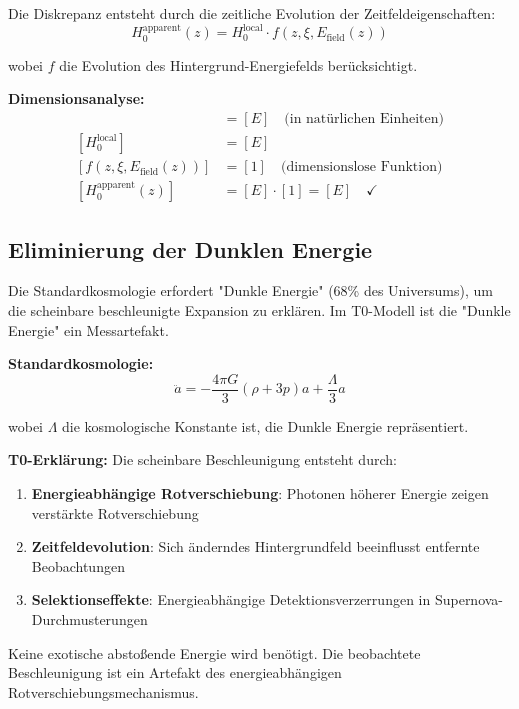 \documentclass[12pt,a4paper]{report}
\begin{document}
	Die Diskrepanz entsteht durch die zeitliche Evolution der Zeitfeldeigenschaften:
	\begin{equation}
		H_0^{\text{apparent}}(z) = H_0^{\text{local}} \cdot f(z, \xi, E_{\text{field}}(z))
	\end{equation}
	
	wobei $f$ die Evolution des Hintergrund-Energiefelds berücksichtigt.
	
	\textbf{Dimensionsanalyse:}
	\begin{align}
		[H_0^{\text{apparent}}(z)] &= [E] \quad \text{(in natürlichen Einheiten)} \\
		[H_0^{\text{local}}] &= [E] \\
		[f(z, \xi, E_{\text{field}}(z))] &= [1] \quad \text{(dimensionslose Funktion)} \\
		[H_0^{\text{apparent}}(z)] &= [E] \cdot [1] = [E] \quad \checkmark
	\end{align}
	
	\subsection{Eliminierung der Dunklen Energie}
	\label{subsec:dark_energy_elimination}
	
	Die Standardkosmologie erfordert "Dunkle Energie" (68\% des Universums), um die scheinbare beschleunigte Expansion zu erklären. Im T0-Modell ist die "Dunkle Energie" ein Messartefakt.
	
	\textbf{Standardkosmologie:}
	\begin{equation}
		\ddot{a} = -\frac{4\pi G}{3}(\rho + 3p)a + \frac{\Lambda}{3}a
	\end{equation}
	
	wobei $\Lambda$ die kosmologische Konstante ist, die Dunkle Energie repräsentiert.
	
	\textbf{T0-Erklärung:}
	Die scheinbare Beschleunigung entsteht durch:
	\begin{enumerate}
		\item \textbf{Energieabhängige Rotverschiebung}: Photonen höherer Energie zeigen verstärkte Rotverschiebung
		\item \textbf{Zeitfeldevolution}: Sich änderndes Hintergrundfeld beeinflusst entfernte Beobachtungen
		\item \textbf{Selektionseffekte}: Energieabhängige Detektionsverzerrungen in Supernova-Durchmusterungen
	\end{enumerate}
	
	Keine exotische abstoßende Energie wird benötigt. Die beobachtete Beschleunigung ist ein Artefakt des energieabhängigen Rotverschiebungsmechanismus.
	
\end{document}
